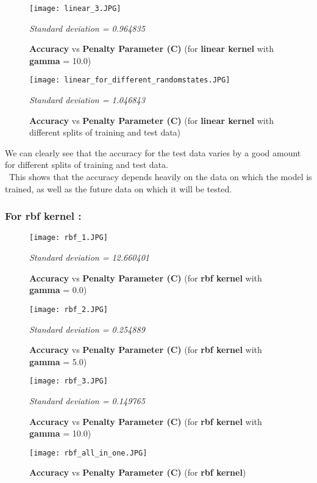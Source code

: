 \documentclass{report}
\begin{document}
\begin{figure}[!h]
  \texttt{[image: linear\_3.JPG]}
  \caption{\textbf{Accuracy }vs\textbf{ Penalty Parameter (C)} (for \textbf{linear kernel} with \textbf{gamma} = 10.0)}
  \label{fig:}
  \emph{\normalsize Standard deviation = 0.964835}
\end{figure}

\pagebreak
\begin{figure}[!h]
  \texttt{[image: linear\_for\_different\_randomstates.JPG]}
  \caption{\textbf{Accuracy }vs\textbf{ Penalty Parameter (C)} (for \textbf{linear kernel} with different splits of training and test data)}
  \label{fig:}
  \emph{\normalsize Standard deviation = 1.046843}
\end{figure}

We can clearly see that the accuracy for the test data varies by a good amount for different splits of training and test data.\\
\linebreak
\ This shows that the accuracy depends heavily on the data on which the model is trained, as well as the future data on which it will be tested. 


\subsubsection{\textbf \Large  {For rbf kernel :}}
\begin{figure}[!h]
  \texttt{[image: rbf\_1.JPG]}
  \caption{\textbf{Accuracy }vs\textbf{ Penalty Parameter (C)} (for \textbf{rbf kernel} with \textbf{gamma} = 0.0)}
  \label{fig:}
  \emph{\normalsize Standard deviation = 12.660401}
\end{figure}
\pagebreak
\begin{figure}[!h]
  \texttt{[image: rbf\_2.JPG]}
  \caption{\textbf{Accuracy }vs\textbf{ Penalty Parameter (C)} (for \textbf{rbf kernel} with \textbf{gamma} = 5.0)}
  \label{fig:}
  \emph{\normalsize Standard deviation = 0.254889}
\end{figure}

\begin{figure}[!h]
  \texttt{[image: rbf\_3.JPG]}
  \caption{\textbf{Accuracy }vs\textbf{ Penalty Parameter (C)} (for \textbf{rbf kernel} with \textbf{gamma} = 10.0)}
  \label{fig:}
  \emph{\normalsize Standard deviation = 0.149765}
\end{figure}
\pagebreak
\begin{figure}[!h]
  \texttt{[image: rbf\_all\_in\_one.JPG]}
  \caption{\textbf{Accuracy }vs\textbf{ Penalty Parameter (C)} (for \textbf{rbf kernel})}
  \label{fig:}
\end{figure}
\end{document}
